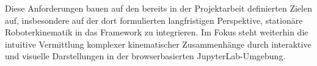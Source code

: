 Diese Anforderungen bauen auf den bereits in der Projektarbeit definierten Zielen auf,
insbesondere auf der dort formulierten langfristigen Perspektive,
stationäre Roboterkinematik in das Framework zu integrieren.
Im Fokus steht weiterhin die intuitive Vermittlung komplexer kinematischer Zusammenhänge durch interaktive und visuelle Darstellungen in der browserbasierten JupyterLab-Umgebung.

